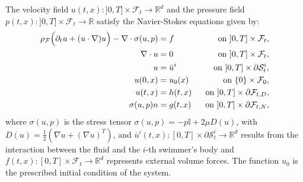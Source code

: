 \documentclass[graybox]{svmult}
\newcommand{\Fluid}{\mathcal{F}} %
\newcommand{\Vel}{u} %
\newcommand{\Pres}{p} %
\newcommand{\Viscosity}{\mu} %
\newcommand{\Solid}{\mathcal{S}} %
\newcommand{\normal}{n} %
\newcommand{\CompDomain}{\Fluid}
\newcommand{\R}{\mathbb{R}}
\begin{document}
The velocity field $\Vel(t,x):]0,T]\times \CompDomain_t \rightarrow \R^d$ and the pressure field $\Pres(t,x):]0,T]\times\CompDomain_t \rightarrow \R$ satisfy the Navier-Stokes equations given by: 
\begin{equation}
	\begin{aligned}
		\rho_\Fluid \Big(\partial_t \Vel +( \Vel \cdot \nabla )\Vel \Big) - \nabla \cdot \sigma(u,p) &=  f%
		\quad &\text{on $ ]0,T]\times \CompDomain_t$},
		\\
		\nabla \cdot \Vel &= 0  \quad&\text{on $ ]0,T]\times \CompDomain_t$},\\
		\Vel &= \bar{\Vel}^i%
		\quad &\text{on $]0,T]\times \partial \Solid_t^i$},\\
		\Vel(0,x) &= \Vel_0(x) \quad &\text{on $ \{0\}\times\CompDomain_0$},\\
		\Vel(t,x) &= h(t,x) &\text{on $ ]0,T]\times\partial\CompDomain_{t,D}$},\\
		\sigma(u,p) \normal&=  g(t,x) &\text{on $ ]0,T]\times\partial\CompDomain_{t,N}$},
	\end{aligned}
	\label{Eq:NS}
\end{equation}
where $\sigma(u,p)$ is the stress tensor $\sigma(u,p) = -\Pres\mathbb{I} + 2 \mu D(u)$, with $D(u) = \frac{1}{2}\left(\nabla u + (\nabla u)^T\right)$, and
$\bar{\Vel}^i(t,x):[0,T]\times\partial \Solid_t^i \rightarrow \R^d$ results from the interaction between the fluid and the $i$-th swimmer's body and $f(t,x):[0,T]\times\CompDomain_t \rightarrow \R^d$ represents external volume forces. The function $u_0$ is the prescribed initial condition of the system. 
\end{document}
